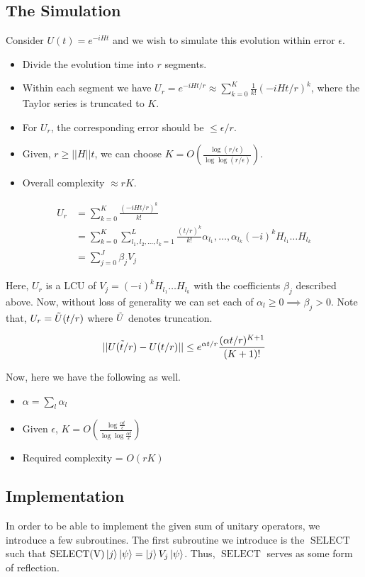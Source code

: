 \documentclass[
10pt, %
a4paper, %
oneside, %
headinclude,footinclude, %
BCOR5mm, %
]{scrartcl}
\begin{document}
\subsection{The Simulation}
Consider $U(t) = e^{-iHt}$ and we wish to simulate this evolution within error $\epsilon$.
\begin{itemize}
    \item Divide the evolution time into $r$ segments.
    \item Within each segment we have $U_r = e^{-iHt/r} \approx \sum_{k = 0}^{K} \frac{1}{k!} (-iHt/r)^k$, where the Taylor series is truncated to $K$.
    \item For $U_r$, the corresponding error should be $\leq \epsilon/r$.
    \item Given, $r \geq ||H||t$, we can choose $K = O(\frac{\log(r/\epsilon)}{\log\log{(r/\epsilon)}})$.
    \item Overall complexity $\approx rK$.
\end{itemize}
\begin{align*}
U_r &= \sum_{k = 0}^K \frac{(-iHt/r)^k}{k!}\\ &= \sum_{k = 0}^K \sum_{l_1, l_2,\ldots, l_k = 1}^L \frac{(t/r)^k}{k!} \alpha_l_1,\ldots, \alpha_l_k (-i)^k H_l_1 \ldots H_l_k\\ &= \sum_{j = 0}^{J} \beta_j V_j
\end{align*}

Here, $U_r$ is a LCU of $V_j = (-i)^k H_l_1 \ldots H_l_k$ with the coefficients $\beta_j$ described above. Now, without loss of generality we can set each of $\alpha_l \geq 0 \implies \beta_j > 0$. Note that, $U_r = \Tilde{U}(t/r)$ where $\Tilde{U}$ denotes truncation.

$$||\Tilde{U(t/r)} - U(t/r)|| \leq e^{\alpha t /r} \frac{(\alpha t/r)^{K + 1}}{(K + 1)!}$$

Now, here we have the following as well.
\begin{itemize}
    \item $\alpha = \sum_l \alpha_l$
    \item Given $\epsilon$, $K = O\left(\frac{\log\frac{\alpha t}{\epsilon}}{\log\log \frac{\alpha t}{\epsilon}}\right)$
    \item Required complexity = $O(rK)$
\end{itemize}

\subsection{Implementation}
In order to be able to implement the given sum of unitary operators, we introduce a few subroutines. The first subroutine we introduce is the $\operatorname{SELECT}$ such that $\operatorname{SELECT(V)}\ket{j}\ket{\psi} = \ket{j}V_j\ket{\psi}$. Thus, $\operatorname{SELECT}$ serves as some form of reflection.\newline
\end{document}
